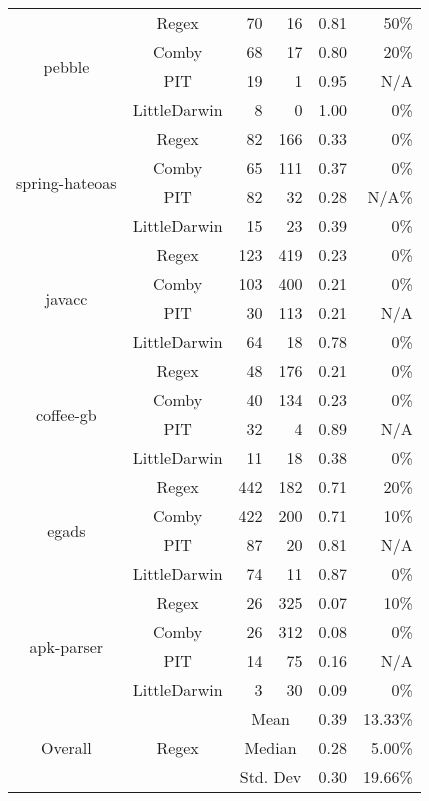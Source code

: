 \documentclass[sigconf,review, anonymous]{acmart}
\begin{document}
{\begin{table}[htbp]
{\begin{tabular}{|c|c|r|r|r|r|}
 \multirow{4}{*}{\small pebble} & Regex & 70 & 16 & 0.81 & 50\% \\\cline{2-6}
    & Comby & 68 & 17 & 0.80 & 20\% \\\cline{2-6}
    & PIT & 19 & 1 & 0.95 & N/A \\ \cline{2-6}
    & LittleDarwin & 8 & 0 & 1.00 & 0\% \\ \hline
\multirow{4}{*}{\small spring-hateoas} & Regex & 82 & 166 & 0.33 & 0\% \\\cline{2-6}
    & Comby & 65 & 111 & 0.37 & 0\% \\ \cline{2-6}
    & PIT & 82 & 32 & 0.28 & N/A\% \\ \cline{2-6}
    & LittleDarwin & 15 & 23 & 0.39 & 0\% \\ \hline
\multirow{4}{*}{\small javacc} & Regex & 123 & 419 & 0.23 & 0\% \\\cline{2-6}
    & Comby & 103 & 400 & 0.21 & 0\% \\ \cline{2-6}
    & PIT & 30 & 113 & 0.21 & N/A\\ \cline{2-6}
    & LittleDarwin & 64 & 18 & 0.78 & 0\%\\ \hline
\multirow{4}{*}{\small coffee-gb} & Regex & 48 & 176 & 0.21 & 0\%\\\cline{2-6}
    & Comby & 40 & 134 & 0.23 & 0\% \\ \cline{2-6}
    & PIT & 32 & 4 & 0.89 & N/A \\ \cline{2-6}
    & LittleDarwin & 11 & 18 & 0.38 & 0\%\\ \hline
\multirow{4}{*}{\small egads} & Regex & 442 & 182 & 0.71 & 20\% \\\cline{2-6}
    & Comby & 422 & 200 & 0.71 & 10\% \\ \cline{2-6}
    & PIT & 87 & 20 & 0.81 & N/A \\ \cline{2-6}
    & LittleDarwin & 74 & 11 & 0.87 & 0\% \\ \hline
\multirow{4}{*}{\small apk-parser} & Regex & 26 & 325 & 0.07 & 10\%\\\cline{2-6}
    & Comby & 26 & 312 & 0.08 & 0\%\\ \cline{2-6}
    & PIT & 14 & 75  & 0.16 & N/A\\ \cline{2-6}
    & LittleDarwin & 3 & 30 & 0.09 & 0\%\\ \hline
    
\multirow{12}{*}{Overall} & \multirow{3}{*}{Regex} & \multicolumn{2}{c|}{Mean} & 0.39  & 13.33\%\\\cline{3-6}
    &   &  \multicolumn{2}{c|}{Median} & 0.28 & 5.00\% \\\cline{3-6}
    &   &  \multicolumn{2}{c|}{Std. Dev} & 0.30 & 19.66\% \\\cline{2-6}


\end{tabular}}
\end{table}}
\end{document}
